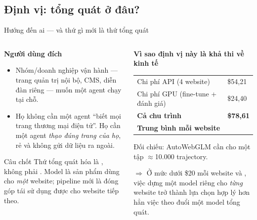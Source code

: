 \subsection{Định vị: tổng quát ở đâu?}
\begin{frame}{Hướng đến ai --- và thứ gì mới là thứ tổng quát}
  \footnotesize
  \begin{columns}[t]
    \begin{column}{0.5\textwidth}
      \textbf{Người dùng đích}
      \scriptsize
      \begin{itemize}\setlength{\itemsep}{2pt}
        \item Nhóm/doanh nghiệp vận hành  --- trang quản
              trị nội bộ, CMS, diễn đàn riêng --- muốn một agent chạy tại chỗ.
        \item Họ không cần một agent ``biết mọi trang thương mại điện tử''. Họ cần một
              agent \emph{thạo đúng trang của họ}, rẻ và không gửi dữ liệu ra ngoài.
      \end{itemize}
      \vspace{0.12cm}
      \begin{block}{Câu chốt}
        \scriptsize
        Thứ tổng quát hóa là , không phải . Model là sản phẩm
        dùng cho \emph{một} website; pipeline mới là đóng góp tái sử dụng được cho
        website tiếp theo.
      \end{block}
    \end{column}
    \begin{column}{0.48\textwidth}
      \textbf{Vì sao định vị này là khả thi về kinh tế}
      \scriptsize
      \vspace{0.05cm}
      \begin{tabular}{@{}L{3.4cm} R{1.5cm}@{}}
        \toprule
        Chi phí API (4 website) & \$54,21 \\
        Chi phí GPU (fine-tune + đánh giá) & \$24,40 \\
        \midrule
        \textbf{Cả chu trình} & \textbf{\$78,61} \\
        \textbf{Trung bình mỗi website} &  \\
        \bottomrule
      \end{tabular}\par
      \vspace{0.1cm}
      \raggedright
      Đối chiếu: AutoWebGLM cần  cho một tập
      $\approx$10.000 trajectory.
      \vspace{0.08cm}

      $\Rightarrow$ Ở mức dưới \$20 mỗi website và , việc
      dựng một model riêng cho \emph{từng} website trở thành lựa chọn hợp lý hơn hẳn
      việc theo đuổi một model tổng quát.
    \end{column}
  \end{columns}
\end{frame}

